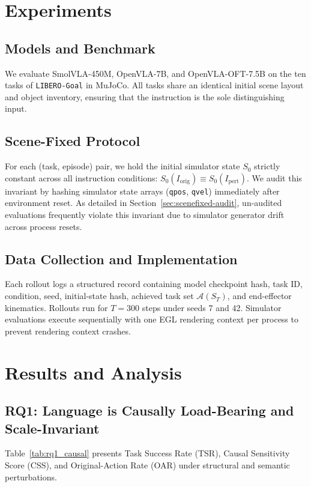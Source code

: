 \documentclass[11pt]{article}
\begin{document}
\section{Experiments}
\label{sec:experiments}

\subsection{Models and Benchmark}
We evaluate SmolVLA-450M, OpenVLA-7B, and OpenVLA-OFT-7.5B on the ten tasks of \texttt{LIBERO-Goal} in MuJoCo. All tasks share an identical initial scene layout and object inventory, ensuring that the instruction is the sole distinguishing input.

\subsection{Scene-Fixed Protocol}
For each (task, episode) pair, we hold the initial simulator state $S_0$ strictly constant across all instruction conditions: $S_0(I_{\text{orig}}) \equiv S_0(I_{\text{pert}})$. We audit this invariant by hashing simulator state arrays (\texttt{qpos}, \texttt{qvel}) immediately after environment reset. As detailed in Section~\ref{sec:scenefixed-audit}, un-audited evaluations frequently violate this invariant due to simulator generator drift across process resets.

\subsection{Data Collection and Implementation}
Each rollout logs a structured record containing model checkpoint hash, task ID, condition, seed, initial-state hash, achieved task set $\mathcal{A}(S_T)$, and end-effector kinematics. Rollouts run for $T=300$ steps under seeds 7 and 42. Simulator evaluations execute sequentially with one EGL rendering context per process to prevent rendering context crashes.

\section{Results and Analysis}

\subsection{RQ1: Language is Causally Load-Bearing and Scale-Invariant}
Table~\ref{tab:rq1_causal} presents Task Success Rate (TSR), Causal Sensitivity Score (CSS), and Original-Action Rate (OAR) under structural and semantic perturbations.
\end{document}
